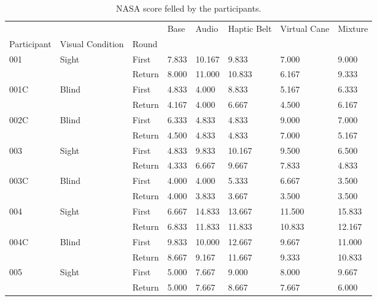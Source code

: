 
\begin{table}[!htb]
\centering
\caption{NASA score felled by the participants.}
\label{tab:nasa_table}
\begin{tabular}{llllllll}
\toprule
    &       &        &  Base &  Audio & Haptic Belt & Virtual Cane & Mixture \\
Participant & Visual Condition & Round &       &        &             &              &         \\
\midrule
001 & Sight & First & 7.833 & 10.167 &       9.833 &        7.000 &   9.000 \\
    &       & Return & 8.000 & 11.000 &      10.833 &        6.167 &   9.333 \\
001C & Blind & First & 4.833 &  4.000 &       8.833 &        5.167 &   6.333 \\
    &       & Return & 4.167 &  4.000 &       6.667 &        4.500 &   6.167 \\
002C & Blind & First & 6.333 &  4.833 &       4.833 &        9.000 &   7.000 \\
    &       & Return & 4.500 &  4.833 &       4.833 &        7.000 &   5.167 \\
003 & Sight & First & 4.833 &  9.833 &      10.167 &        9.500 &   6.500 \\
    &       & Return & 4.333 &  6.667 &       9.667 &        7.833 &   4.833 \\
003C & Blind & First & 4.000 &  4.000 &       5.333 &        6.667 &   3.500 \\
    &       & Return & 4.000 &  3.833 &       3.667 &        3.500 &   3.500 \\
004 & Sight & First & 6.667 & 14.833 &      13.667 &       11.500 &  15.833 \\
    &       & Return & 6.833 & 11.833 &      11.833 &       10.833 &  12.167 \\
004C & Blind & First & 9.833 & 10.000 &      12.667 &        9.667 &  11.000 \\
    &       & Return & 8.667 &  9.167 &      11.667 &        9.333 &  10.833 \\
005 & Sight & First & 5.000 &  7.667 &       9.000 &        8.000 &   9.667 \\
    &       & Return & 5.000 &  7.667 &       8.667 &        7.667 &   6.000 \\
\bottomrule
\end{tabular}
\end{table}

